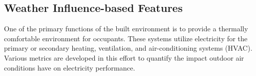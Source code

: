 \subsection{Weather Influence-based Features}
\label{sec:weatherfeatures}

One of the primary functions of the built environment is to provide a thermally comfortable environment for occupants. These systems utilize electricity for the primary or secondary heating, ventilation, and air-conditioning systems (HVAC). Various metrics are developed in this effort to quantify the impact outdoor air conditions have on electricity performance.